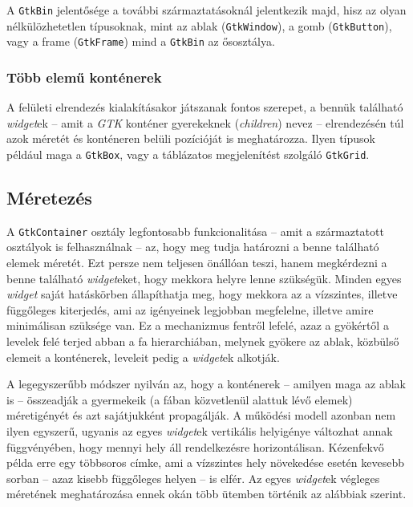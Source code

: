 \label{sec:bin}
A \texttt{GtkBin} jelentősége a további származtatásoknál jelentkezik majd, hisz az olyan nélkülözhetetlen típusoknak, mint az ablak (\texttt{GtkWindow}), a gomb (\texttt{GtkButton}), vagy a frame (\texttt{GtkFrame}) mind a \texttt{GtkBin} az ősosztálya.

\subsubsection{Több elemű konténerek}

A felületi elrendezés kialakításakor játszanak fontos szerepet, a bennük található \textit{widget}ek -- amit a \textit{GTK} konténer gyerekeknek (\textit{children}) nevez -- elrendezésén túl azok méretét és konténeren belüli pozícióját is meghatározza. Ilyen típusok például maga a \texttt{GtkBox}, vagy a táblázatos megjelenítést szolgáló \texttt{GtkGrid}.

\subsection{Méretezés}

A \texttt{GtkContainer} osztály legfontosabb funkcionalitása -- amit a származtatott osztályok is felhasználnak -- az, hogy meg tudja határozni a benne található elemek méretét. Ezt persze nem teljesen önállóan teszi, hanem megkérdezni a benne található \textit{widget}eket, hogy mekkora helyre lenne szükségük. Minden egyes \textit{widget} saját hatáskörben állapíthatja meg, hogy mekkora az a vízszintes, illetve függőleges kiterjedés, ami az igényeinek legjobban megfelelne, illetve amire minimálisan szüksége van. Ez a mechanizmus fentről lefelé, azaz a gyökértől a levelek felé terjed abban a fa hierarchiában, melynek gyökere az ablak, közbülső elemeit a konténerek, leveleit pedig a \textit{widget}ek alkotják.

A legegyszerűbb módszer nyilván az, hogy a konténerek -- amilyen maga az ablak is -- összeadják a gyermekeik (a fában közvetlenül alattuk lévő elemek) méretigényét és azt sajátjukként propagálják. A működési modell azonban nem ilyen egyszerű, ugyanis az egyes \textit{widget}ek vertikális helyigénye változhat annak függvényében, hogy mennyi hely áll rendelkezésre horizontálisan. Kézenfekvő példa erre egy többsoros címke, ami a vízszintes hely növekedése esetén kevesebb sorban -- azaz kisebb függőleges helyen -- is elfér. Az egyes \textit{widget}ek végleges méretének meghatározása ennek okán több ütemben történik az alábbiak szerint.

